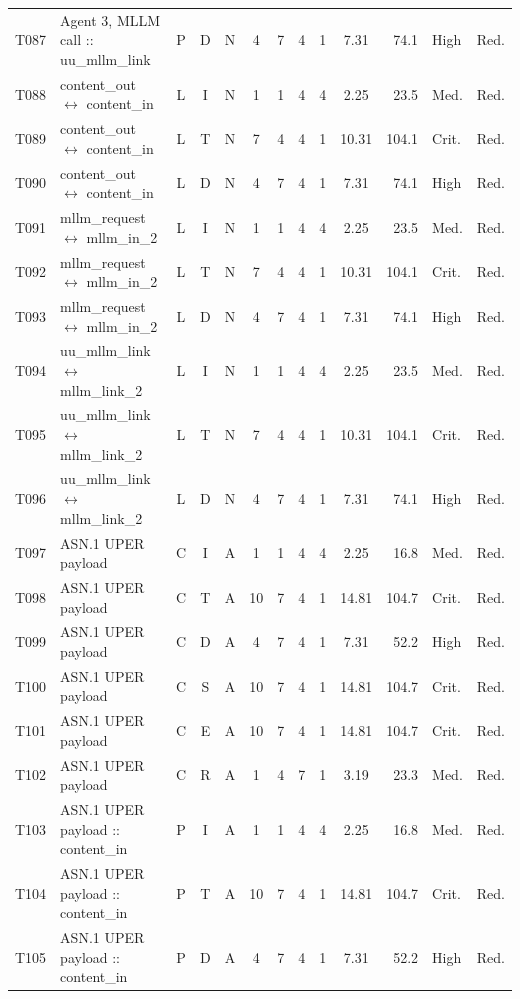 \documentclass[9pt]{extarticle}
\begin{document}
\begin{longtable}{l>{\raggedright\arraybackslash}p{6.3cm}ccccccccrll}
T087 & Agent 3, MLLM call :: uu\_mllm\_link & P & D & N & 4 & 7 & 4 & 1 & 7.31 & 74.1 & High & Red. \\
T088 & content\_out $\leftrightarrow$ content\_in & L & I & N & 1 & 1 & 4 & 4 & 2.25 & 23.5 & Med. & Red. \\
T089 & content\_out $\leftrightarrow$ content\_in & L & T & N & 7 & 4 & 4 & 1 & 10.31 & 104.1 & Crit. & Red. \\
T090 & content\_out $\leftrightarrow$ content\_in & L & D & N & 4 & 7 & 4 & 1 & 7.31 & 74.1 & High & Red. \\
T091 & mllm\_request $\leftrightarrow$ mllm\_in\_2 & L & I & N & 1 & 1 & 4 & 4 & 2.25 & 23.5 & Med. & Red. \\
T092 & mllm\_request $\leftrightarrow$ mllm\_in\_2 & L & T & N & 7 & 4 & 4 & 1 & 10.31 & 104.1 & Crit. & Red. \\
T093 & mllm\_request $\leftrightarrow$ mllm\_in\_2 & L & D & N & 4 & 7 & 4 & 1 & 7.31 & 74.1 & High & Red. \\
T094 & uu\_mllm\_link $\leftrightarrow$ mllm\_link\_2 & L & I & N & 1 & 1 & 4 & 4 & 2.25 & 23.5 & Med. & Red. \\
T095 & uu\_mllm\_link $\leftrightarrow$ mllm\_link\_2 & L & T & N & 7 & 4 & 4 & 1 & 10.31 & 104.1 & Crit. & Red. \\
T096 & uu\_mllm\_link $\leftrightarrow$ mllm\_link\_2 & L & D & N & 4 & 7 & 4 & 1 & 7.31 & 74.1 & High & Red. \\
T097 & ASN.1 UPER payload & C & I & A & 1 & 1 & 4 & 4 & 2.25 & 16.8 & Med. & Red. \\
T098 & ASN.1 UPER payload & C & T & A & 10 & 7 & 4 & 1 & 14.81 & 104.7 & Crit. & Red. \\
T099 & ASN.1 UPER payload & C & D & A & 4 & 7 & 4 & 1 & 7.31 & 52.2 & High & Red. \\
T100 & ASN.1 UPER payload & C & S & A & 10 & 7 & 4 & 1 & 14.81 & 104.7 & Crit. & Red. \\
T101 & ASN.1 UPER payload & C & E & A & 10 & 7 & 4 & 1 & 14.81 & 104.7 & Crit. & Red. \\
T102 & ASN.1 UPER payload & C & R & A & 1 & 4 & 7 & 1 & 3.19 & 23.3 & Med. & Red. \\
T103 & ASN.1 UPER payload :: content\_in & P & I & A & 1 & 1 & 4 & 4 & 2.25 & 16.8 & Med. & Red. \\
T104 & ASN.1 UPER payload :: content\_in & P & T & A & 10 & 7 & 4 & 1 & 14.81 & 104.7 & Crit. & Red. \\
T105 & ASN.1 UPER payload :: content\_in & P & D & A & 4 & 7 & 4 & 1 & 7.31 & 52.2 & High & Red. \\

\end{longtable}
\end{document}
